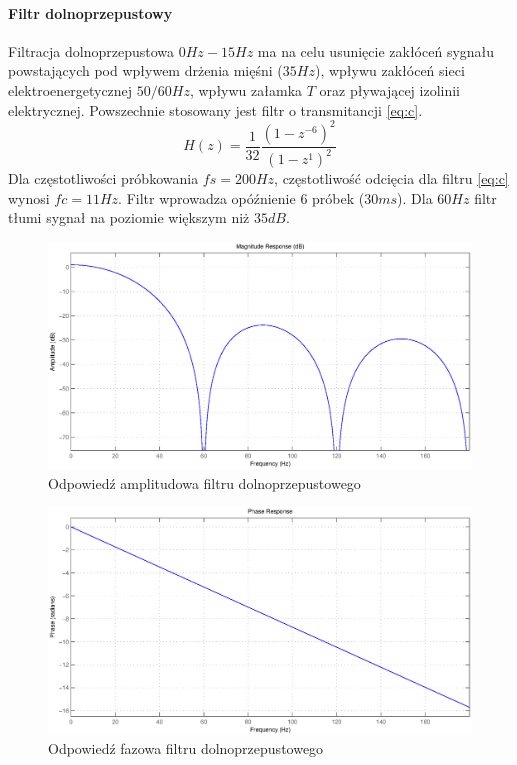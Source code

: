 \documentclass[a4paper, 11pt]{article}
\begin{document}
\paragraph{Filtr dolnoprzepustowy}
Filtracja dolnoprzepustowa $0Hz - 15Hz$ ma na celu usunięcie zakłóceń sygnału powstających
pod wpływem drżenia mięśni ($35 Hz$), wpływu
zakłóceń sieci elektroenergetycznej $50/60 Hz$, wpływu załamka $T$ oraz pływającej izolinii
elektrycznej. Powszechnie stosowany jest filtr o transmitancji \eqref{eq:c}.
\begin{equation}
H(z) = \frac{1}{32} \frac{(1-z^{-6})^2}{(1-z^1)^2}\label{eq:c}
\end{equation}
\indent Dla częstotliwości próbkowania $fs = 200 Hz$, częstotliwość odcięcia
 dla filtru \eqref{eq:c} wynosi $fc = 11 Hz$. Filtr wprowadza opóźnienie $6$ próbek ($30 ms$). Dla $60 Hz$ filtr
tłumi sygnał na poziomie większym niż $35 dB$.
\begin{figure}[h]
\centering
\includegraphics[scale=0.5]{include/lowpassampres.eps}
\caption{Odpowiedź amplitudowa filtru dolnoprzepustowego}
\label{lowpassampres}
\end{figure}
\begin{figure}[htl]
\centering
\includegraphics[scale=0.5]{include/lowpassphaseres.eps}
\caption{Odpowiedź fazowa filtru dolnoprzepustowego}
\label{lowpassphaseres}
\end{figure}
\end{document}
